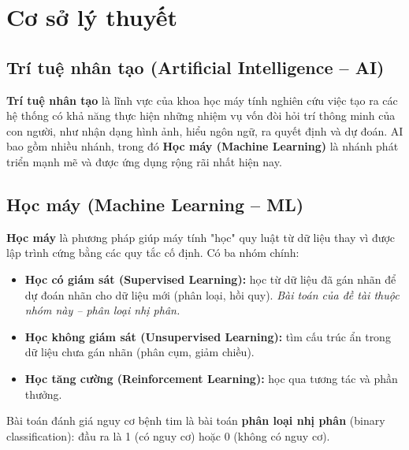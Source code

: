 
\chapter{Cơ sở lý thuyết}
\label{chap:theory}

\section{Trí tuệ nhân tạo (Artificial Intelligence -- AI)}
\textbf{Trí tuệ nhân tạo} là lĩnh vực của khoa học máy tính nghiên cứu việc tạo
ra các hệ thống có khả năng thực hiện những nhiệm vụ vốn đòi hỏi trí thông minh
của con người, như nhận dạng hình ảnh, hiểu ngôn ngữ, ra quyết định và dự đoán.
AI bao gồm nhiều nhánh, trong đó \textbf{Học máy (Machine Learning)} là nhánh
phát triển mạnh mẽ và được ứng dụng rộng rãi nhất hiện nay.

\section{Học máy (Machine Learning -- ML)}
\textbf{Học máy} là phương pháp giúp máy tính "học" quy luật từ dữ liệu thay vì
được lập trình cứng bằng các quy tắc cố định. Có ba nhóm chính:
\begin{itemize}
  \item \textbf{Học có giám sát (Supervised Learning):} học từ dữ liệu đã gán
        nhãn để dự đoán nhãn cho dữ liệu mới (phân loại, hồi quy). \emph{Bài toán
        của đề tài thuộc nhóm này -- phân loại nhị phân.}
  \item \textbf{Học không giám sát (Unsupervised Learning):} tìm cấu trúc ẩn
        trong dữ liệu chưa gán nhãn (phân cụm, giảm chiều).
  \item \textbf{Học tăng cường (Reinforcement Learning):} học qua tương tác và
        phần thưởng.
\end{itemize}
Bài toán đánh giá nguy cơ bệnh tim là bài toán \textbf{phân loại nhị phân}
(binary classification): đầu ra là 1 (có nguy cơ) hoặc 0 (không có nguy cơ).

